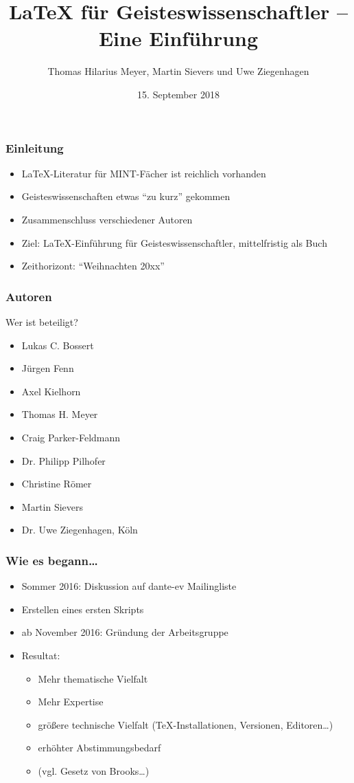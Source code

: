 \documentclass[12pt,ngerman]{beamer}
\title{\LaTeX{} für Geisteswissenschaftler -- Eine Einführung}
\date{15. September 2018}
\author{Thomas Hilarius Meyer, Martin Sievers und Uwe Ziegenhagen}
\begin{document}
\begin{frame}
	 \maketitle
\end{frame}

\begin{frame}
\frametitle{Einleitung}

\begin{itemize}
\item \LaTeX-Literatur für MINT-Fächer ist reichlich vorhanden
\item Geisteswissenschaften etwas \enquote{zu kurz} gekommen
\item Zusammenschluss verschiedener Autoren
\item Ziel: \LaTeX-Einführung für Geisteswissenschaftler, mittelfristig als Buch
\item Zeithorizont: \enquote{Weihnachten 20xx} 
\end{itemize}

\end{frame}

\begin{frame}
\frametitle{Autoren}

Wer ist beteiligt?

\begin{itemize}
\item Lukas C. Bossert
\item Jürgen Fenn
\item Axel Kielhorn
\item Thomas H. Meyer
\item Craig Parker-Feldmann
\item Dr. Philipp Pilhofer
\item Christine Römer
\item Martin Sievers
\item Dr. Uwe Ziegenhagen, Köln
\end{itemize}
\end{frame}

\begin{frame}
\frametitle{Wie es begann\ldots}

\begin{itemize}
\item Sommer 2016: Diskussion auf dante-ev Mailingliste
\item Erstellen eines ersten Skripts
\item ab November 2016: Gründung der Arbeitsgruppe
\item Resultat:
  \begin{itemize}
  \item Mehr thematische Vielfalt
  \item Mehr Expertise
  \item größere technische Vielfalt (\TeX-Installationen, Versionen, Editoren\ldots)
  \item erhöhter Abstimmungsbedarf
  \item (vgl. Gesetz von Brooks\ldots)
  \end{itemize}
\end{itemize}
\end{frame}
\end{document}
